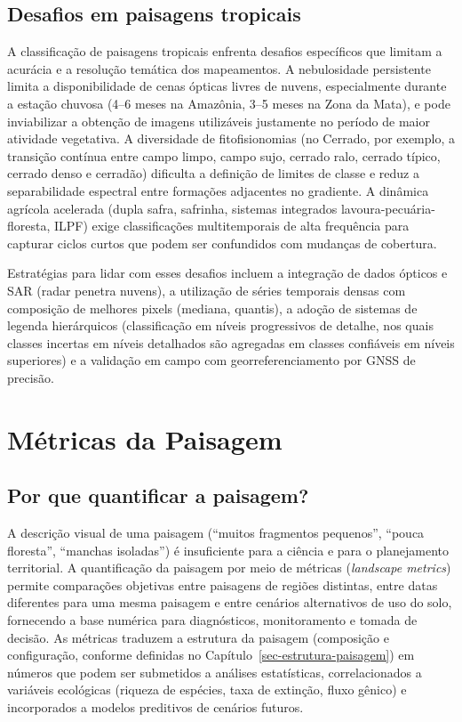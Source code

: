 \documentclass[
  portuguese,
  11pt,
  a4paper,
  open=any]{scrbook}
\begin{document}
\section{Desafios em paisagens
tropicais}\label{desafios-em-paisagens-tropicais}

A classificação de paisagens tropicais enfrenta desafios específicos que
limitam a acurácia e a resolução temática dos mapeamentos. A
nebulosidade persistente limita a disponibilidade de cenas ópticas
livres de nuvens, especialmente durante a estação chuvosa (4--6 meses na
Amazônia, 3--5 meses na Zona da Mata), e pode inviabilizar a obtenção de
imagens utilizáveis justamente no período de maior atividade vegetativa.
A diversidade de fitofisionomias (no Cerrado, por exemplo, a transição
contínua entre campo limpo, campo sujo, cerrado ralo, cerrado típico,
cerrado denso e cerradão) dificulta a definição de limites de classe e
reduz a separabilidade espectral entre formações adjacentes no
gradiente. A dinâmica agrícola acelerada (dupla safra, safrinha,
sistemas integrados lavoura-pecuária-floresta, ILPF) exige
classificações multitemporais de alta frequência para capturar ciclos
curtos que podem ser confundidos com mudanças de cobertura.

Estratégias para lidar com esses desafios incluem a integração de dados
ópticos e SAR (radar penetra nuvens), a utilização de séries temporais
densas com composição de melhores pixels (mediana, quantis), a adoção de
sistemas de legenda hierárquicos (classificação em níveis progressivos
de detalhe, nos quais classes incertas em níveis detalhados são
agregadas em classes confiáveis em níveis superiores) e a validação em
campo com georreferenciamento por GNSS de precisão.

\chapter{Métricas da Paisagem}\label{sec-metricas}

\section{Por que quantificar a
paisagem?}\label{por-que-quantificar-a-paisagem}

A descrição visual de uma paisagem (``muitos fragmentos pequenos'',
``pouca floresta'', ``manchas isoladas'') é insuficiente para a ciência
e para o planejamento territorial. A quantificação da paisagem por meio
de métricas (\emph{landscape metrics}) permite comparações objetivas
entre paisagens de regiões distintas, entre datas diferentes para uma
mesma paisagem e entre cenários alternativos de uso do solo, fornecendo
a base numérica para diagnósticos, monitoramento e tomada de decisão. As
métricas traduzem a estrutura da paisagem (composição e configuração,
conforme definidas no Capítulo~\ref{sec-estrutura-paisagem}) em números
que podem ser submetidos a análises estatísticas, correlacionados a
variáveis ecológicas (riqueza de espécies, taxa de extinção, fluxo
gênico) e incorporados a modelos preditivos de cenários futuros.
\end{document}
